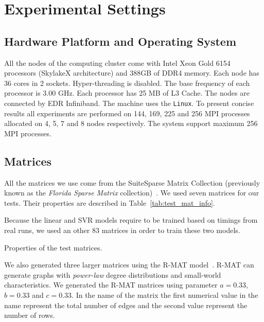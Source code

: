 \documentclass[sigconf,review,anonymous]{acmart}
\begin{document}
\section{Experimental Settings}
\label{sec:settings}

\subsection{Hardware Platform and Operating System}
All the nodes of the computing cluster come with Intel Xeon Gold
6154 processors (SkylakeX architecture) and 388GB of DDR4
memory. Each node has 36 cores in 2 sockets. Hyper-threading is
disabled. The base frequency of each processor is 3.00 GHz.  Each
processor has 25 MB of L3 Cache. The nodes are connected by EDR
Infiniband. The machine uses the \texttt{Linux}. To present
concise results all experiments are performed on 144, 169, 225 and 256 MPI processes
allocated on 4, 5, 7 and 8 nodes respectively. The system support maximum 256 MPI processes.

\subsection{Matrices}

All the matrices we use come from the SuiteSparse Matrix Collection
(previously known as the \textit{Florida Sparse Matrix}
collection)~\cite{Davis11}. We used seven matrices for our
tests. Their properties are described in Table~\ref{tab:test_mat_info}.

Because the linear and SVR models require to be trained based on
timings from real runs, we used an other 83 matrices in order to train
these two models.

\begin{table}[htb]
\caption{Properties of the test matrices.}
\label{tab:test_mat_info}
\let\center\empty
\let\endcenter\relax
\centering
\resizebox{.8\width}{!}{}
\end{table}

We also generated three larger matrices using the R-MAT
model~\cite{chakrabarti2004r}. R-MAT can generate graphs with
\textit{power-law} degree distributions and small-world
characteristics.  We generated the R-MAT matrices using parameter
$a=0.33$, $b=0.33$ and $c=0.33$. In the name of the matrix the first
numerical value in the name represent the total number of edges and
the second value represent the number of rows.
\end{document}
